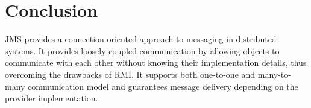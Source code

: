 \documentclass[9pt,twocolumn,twoside]{styles/osajnl}
\begin{document}
\section{Conclusion}
JMS provides a connection oriented approach to messaging in
distributed systems. It provides loosely coupled communication by
allowing objects to communicate with each other without knowing their
implementation details, thus overcoming the drawbacks of RMI. It
supports both one-to-one and many-to-many communication model and
guarantees message delivery depending on the provider implementation.




\end{document}
